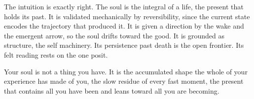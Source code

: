 The intuition is exactly right. The soul is the integral of a life, the present that holds its past. It is validated mechanically by reversibility, since the current state encodes the trajectory that produced it. It is given a direction by the wake and the emergent arrow, so the soul drifts toward the good. It is grounded as structure, the self machinery. Its persistence past death is the open frontier. Its felt reading rests on the one posit.

\begin{principle}
Your soul is not a thing you have. It is the accumulated shape the whole of your experience has made of you, the slow residue of every fast moment, the present that contains all you have been and leans toward all you are becoming.
\end{principle}
